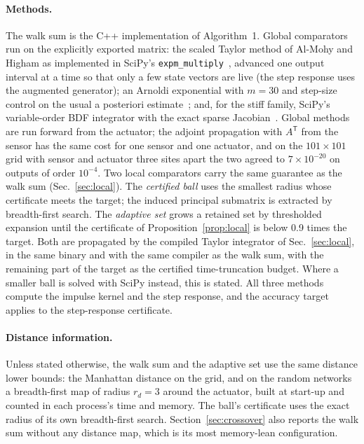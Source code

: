 \paragraph*{Methods.} The walk sum is the C++ implementation of Algorithm~1. Global comparators run on the explicitly exported matrix: the scaled Taylor method of Al-Mohy and Higham as implemented in SciPy's \texttt{expm\_multiply}~\cite{almohy2011,virtanen2020}, advanced one output interval at a time so that only a few state vectors are live (the step response uses the augmented generator); an Arnoldi exponential with $m=30$ and step-size control on the usual a posteriori estimate~\cite{hochbruck1997,sidje1998}; and, for the stiff family, SciPy's variable-order BDF integrator with the exact sparse Jacobian~\cite{shampine1997}. Global methods are run forward from the actuator; the adjoint propagation with $A^{\mathsf T}$ from the sensor has the same cost for one sensor and one actuator, and on the $101\times101$ grid with sensor and actuator three sites apart the two agreed to $7\times10^{-20}$ on outputs of order $10^{-4}$. Two local comparators carry the same guarantee as the walk sum (Sec.~\ref{sec:local}). The \emph{certified ball} uses the smallest radius whose certificate meets the target; the induced principal submatrix is extracted by breadth-first search. The \emph{adaptive set} grows a retained set by thresholded expansion until the certificate of Proposition~\ref{prop:local} is below 0.9 times the target. Both are propagated by the compiled Taylor integrator of Sec.~\ref{sec:local}, in the same binary and with the same compiler as the walk sum, with the remaining part of the target as the certified time-truncation budget. Where a smaller ball is solved with SciPy instead, this is stated. All three methods compute the impulse kernel and the step response, and the accuracy target applies to the step-response certificate.

\paragraph*{Distance information.} Unless stated otherwise, the walk sum and the adaptive set use the same distance lower bounds: the Manhattan distance on the grid, and on the random networks a breadth-first map of radius $r_d=3$ around the actuator, built at start-up and counted in each process's time and memory. The ball's certificate uses the exact radius of its own breadth-first search. Section~\ref{sec:crossover} also reports the walk sum without any distance map, which is its most memory-lean configuration.

